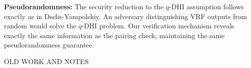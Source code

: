 \textbf{Pseudorandomness:} The security reduction to the $q$-DHI assumption follows exactly as in Dodis-Yampolskiy. An adversary distinguishing VRF outputs from random would solve the $q$-DHI problem. Our verification mechanism reveals exactly the same information as the pairing check, maintaining the same pseudorandomness guarantee.




























































\clearpage






































\clearpage
OLD WORK AND NOTES







